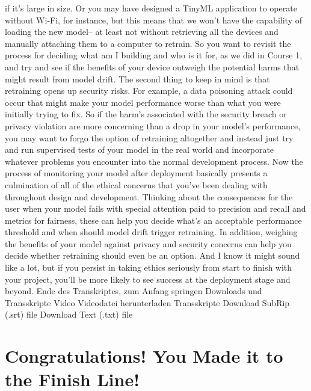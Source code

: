     if it's large in size.
    Or you may have designed a TinyML application to operate without Wi-Fi,
    for instance, but this means that we won't have the capability of loading
    the new model--
    at least not without retrieving all the devices
    and manually attaching them to a computer to retrain.
    So you want to revisit the process for deciding what am I building
    and who is it for, as we did in Course 1, and try
    and see if the benefits of your device outweigh the potential harms that
    might result from model drift.
    The second thing to keep in mind is that retraining opens up security risks.
    For example, a data poisoning attack could
    occur that might make your model performance worse than what
    you were initially trying to fix.
    So if the harm's associated with the security breach or privacy
    violation are more concerning than a drop in your model's performance,
    you may want to forgo the option of retraining
    altogether and instead just try and run supervised tests of your model
    in the real world and incorporate whatever problems you encounter
    into the normal development process.
    Now the process of monitoring your model after deployment
    basically presents a culmination of all of the ethical concerns
    that you've been dealing with throughout design and development.
    Thinking about the consequences for the user when your model fails
    with special attention paid to precision and recall and metrics for fairness,
    these can help you decide what's an acceptable performance threshold
    and when should model drift trigger retraining.
    In addition, weighing the benefits of your model against privacy and security
    concerns can help you decide whether retraining should even be an option.
    And I know it might sound like a lot, but if you
    persist in taking ethics seriously from start to finish with your project,
    you'll be more likely to see success at the deployment stage and beyond.
    Ende des Transkriptes, zum Anfang springen
    Downloads und Transskripte
    Video
    Videodatei herunterladen
    Transskripte
    Download SubRip (.srt) file
    Download Text (.txt) file
    
\section{Congratulations! You Made it to the Finish Line!}

